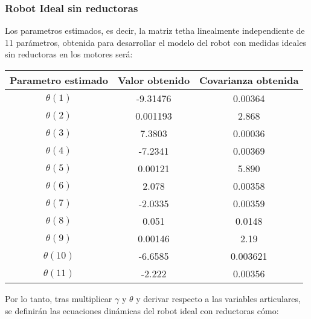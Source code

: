 \subsubsection{Robot Ideal sin reductoras}
Los parametros estimados, es decir, la matriz tetha linealmente independiente de 11 parámetros, obtenida para desarrollar el modelo del robot con medidas ideales sin reductoras en los motores será:
\begin{center}
	\begin{tabular}{| c | c | c |}

		\hline
		Parametro estimado & Valor obtenido & Covarianza obtenida \\
		\hline
		$\theta(1) $ & -9.31476 & 0.00364 \\
		\hline
		$\theta(2) $ & 0.001193 & 2.868 \\
		\hline
		$\theta(3) $ & 7.3803 & 0.00036 \\
		\hline
		$\theta(4) $ & -7.2341 & 0.00369 \\
		\hline
		$\theta(5) $ & 0.00121 & 5.890 \\
		\hline
		$\theta(6) $ & 2.078 & 0.00358 \\
		\hline
		$\theta(7) $ & -2.0335 & 0.00359 \\
		\hline
		$\theta(8) $ & 0.051 & 0.0148 \\
		\hline
		$\theta(9) $ & 0.00146 & 2.19 \\
		\hline
		$\theta(10) $ & -6.6585 & 0.003621 \\
		\hline
		$\theta(11) $ & -2.222 & 0.00356 \\
		\hline
	\end{tabular}
\end{center}
Por lo tanto, tras multiplicar $\gamma$ y $\theta$ y derivar respecto a las variables articulares, se definirán las ecuaciones dinámicas del robot ideal con reductoras cómo:
